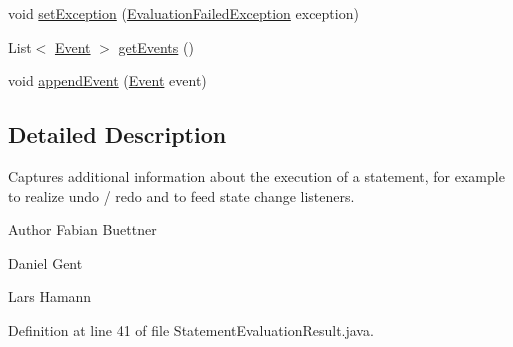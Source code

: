 \begin{DoxyCompactItemize}
\item 
void \hyperlink{classorg_1_1tzi_1_1use_1_1uml_1_1sys_1_1_statement_evaluation_result_ae647ec7e5d672e71e61637624dcbbcb7}{set\-Exception} (\hyperlink{classorg_1_1tzi_1_1use_1_1util_1_1soil_1_1exceptions_1_1_evaluation_failed_exception}{Evaluation\-Failed\-Exception} exception)
\item 
List$<$ \hyperlink{classorg_1_1tzi_1_1use_1_1uml_1_1sys_1_1events_1_1_event}{Event} $>$ \hyperlink{classorg_1_1tzi_1_1use_1_1uml_1_1sys_1_1_statement_evaluation_result_a575379b73489696096c63869fe5d9fdb}{get\-Events} ()
\item 
void \hyperlink{classorg_1_1tzi_1_1use_1_1uml_1_1sys_1_1_statement_evaluation_result_abd2e02ee9aea8a35aff8035debec6194}{append\-Event} (\hyperlink{classorg_1_1tzi_1_1use_1_1uml_1_1sys_1_1events_1_1_event}{Event} event)
\end{DoxyCompactItemize}


\subsection{Detailed Description}
Captures additional information about the execution of a statement, for example to realize undo / redo and to feed state change listeners.

\begin{DoxyAuthor}{Author}
Fabian Buettner 

Daniel Gent 

Lars Hamann 
\end{DoxyAuthor}


Definition at line 41 of file Statement\-Evaluation\-Result.\-java.



